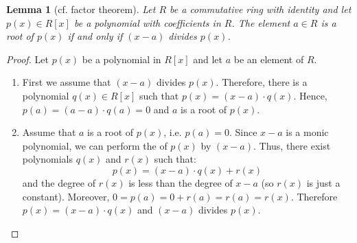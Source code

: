 \documentclass[12pt]{article}
\newtheorem*{lemma}{Lemma}
\theoremstyle{definition}
\begin{document}
\begin{lemma}[cf. factor theorem]
Let $R$ be a commutative ring with identity and let $p(x)\in R[x]$ be a polynomial with coefficients in $R$. The element $a\in R$ is a root of $p(x)$ if and only if $(x-a)$ divides $p(x)$.
\end{lemma}
\begin{proof}
Let $p(x)$ be a polynomial in $R[x]$ and let $a$ be an element of $R$.
\begin{enumerate}
\item First we assume that $(x-a)$ divides $p(x)$. Therefore, there is a polynomial $q(x)\in R[x]$ such that $p(x)=(x-a)\cdot q(x)$. Hence, $p(a)=(a-a)\cdot q(a)=0$ and $a$ is a root of $p(x)$.\\

\item Assume that $a$ is a root of $p(x)$, i.e. $p(a)=0$. Since $x-a$ is a monic polynomial, we can perform the  of $p(x)$ by $(x-a)$. Thus, there exist polynomials $q(x)$ and $r(x)$ such that:
$$p(x)=(x-a)\cdot q(x) + r(x)$$
and the degree of $r(x)$ is less than the degree of $x-a$ (so $r(x)$ is just a constant). Moreover, $0=p(a)=0+r(a)=r(a)=r(x)$. Therefore $p(x)=(x-a)\cdot q(x)$ and $(x-a)$ divides $p(x)$.
\end{enumerate}
\end{proof}
\end{document}
